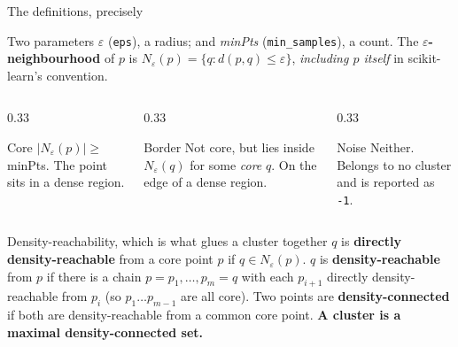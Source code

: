 \documentclass[aspectratio=169]{beamer}
\begin{document}
\begin{frame}[shrink=12]{The definitions, precisely}
  \begin{block}{Two parameters}
    \small $\varepsilon$ (\texttt{eps}), a radius; and \emph{minPts}
    (\texttt{min\_samples}), a count. The
    \textbf{$\varepsilon$-neighbourhood} of $p$ is
    $N_\varepsilon(p) = \{q : d(p,q) \le \varepsilon\}$, \emph{including $p$
    itself} in scikit-learn's convention.
  \end{block}
  \begin{columns}[T]
    \begin{column}{0.33\textwidth}
      \begin{exampleblock}{Core}
        \small $|N_\varepsilon(p)| \ge$ minPts. The point sits in a dense
        region.
      \end{exampleblock}
    \end{column}
    \begin{column}{0.33\textwidth}
      \begin{exampleblock}{Border}
        \small Not core, but lies inside $N_\varepsilon(q)$ for some
        \emph{core} $q$. On the edge of a dense region.
      \end{exampleblock}
    \end{column}
    \begin{column}{0.33\textwidth}
      \begin{exampleblock}{Noise}
        \small Neither. Belongs to no cluster and is reported as
        \texttt{-1}.
      \end{exampleblock}
    \end{column}
  \end{columns}
  \vspace{0.3em}
  \begin{block}{Density-reachability, which is what glues a cluster together}
    \small
    $q$ is \textbf{directly density-reachable} from a core point $p$ if
    $q \in N_\varepsilon(p)$. \quad
    $q$ is \textbf{density-reachable} from $p$ if there is a chain
    $p = p_1, \ldots, p_m = q$ with each $p_{i+1}$ directly
    density-reachable from $p_i$ (so $p_1 \ldots p_{m-1}$ are all core).
    \quad Two points are \textbf{density-connected} if both are
    density-reachable from a common core point. \textbf{A cluster is a
    maximal density-connected set.}
  \end{block}
\end{frame}
\end{document}

